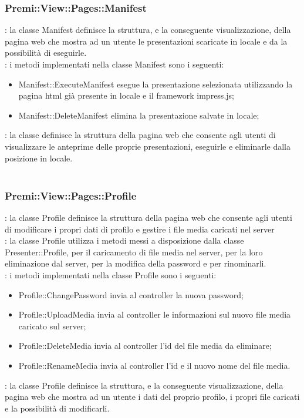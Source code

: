 {		\subsubsection{Premi::View::Pages::Manifest}{
			\textbf{\tipo}: la classe Manifest definisce la struttura, e la conseguente visualizzazione, della pagina web che mostra ad un utente le presentazioni scaricate in locale e da la possibilità di eseguirle.\\
			\textbf{\interfacce}: i metodi implementati nella classe Manifest sono i seguenti:
			\begin{itemize}
				\item Manifest::ExecuteManifest esegue la presentazione selezionata utilizzando la pagina html già presente in locale e il framework impress.js;
				\item Manifest::DeleteManifest elimina la presentazione salvate in locale;
			\end{itemize} 
			\textbf{\attivita}: la classe definisce la struttura della pagina web che consente agli utenti di visualizzare le anteprime delle proprie presentazioni, eseguirle e eliminarle dalla posizione in locale.\\\\
		}
		\subsubsection{Premi::View::Pages::Profile}{
			\textbf{\tipo}: la classe Profile definisce la struttura della pagina web che consente agli utenti di modificare i propri dati di profilo e gestire i file media caricati nel server \\
			\textbf{\relaz}: la classe Profile utilizza i metodi messi a disposizione dalla classe Presenter::Profile, per il caricamento di file media nel server, per la loro eliminazione dal server, per la modifica della password e per rinominarli.\\
			\textbf{\interfacce}: i metodi implementati nella classe Profile sono i seguenti:
			\begin{itemize}
				\item Profile::ChangePassword invia al controller la nuova password;
				\item Profile::UploadMedia invia al controller le informazioni sul nuovo file media caricato sul server;
				\item Profile::DeleteMedia invia al controller l'id del file media da eliminare;
				\item Profile::RenameMedia invia al controller l'id e il nuovo nome del file media.
			\end{itemize}
			\textbf{\attivita}: la classe Profile definisce la struttura, e la conseguente visualizzazione, della pagina web che mostra ad un utente i dati del proprio profilo, i propri file caricati e la possibilità di modificarli.\\
		}
}
